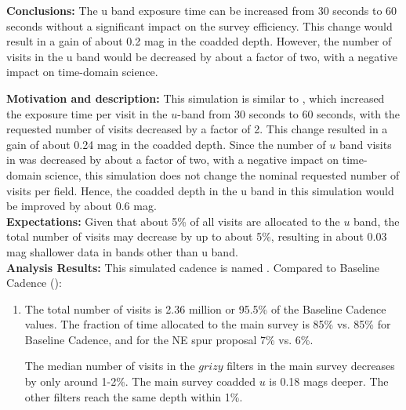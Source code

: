 {\bf Conclusions:} The u band exposure time can be increased from 30
seconds to 60 seconds without a significant impact on the survey
efficiency. This change would result in a gain of about 0.2 mag in the
coadded depth. However, the number of visits in the u band would be
decreased by about a factor of two, with a negative impact on
time-domain science.



{\bf Motivation and description:} This simulation is similar to
, which increased the exposure time
per visit in the $u$-band from 30 seconds to 60 seconds, with the
requested number of visits decreased by a factor of 2. This change
resulted in a gain of about 0.24 mag in the coadded depth. Since the
number of $u$ band visits in  was
decreased by about a factor of two, with a negative impact on
time-domain science, this simulation does not change the nominal
requested number of visits per field. Hence, the coadded depth in the
u band in this simulation would be improved by about 0.6 mag. \\

{\bf Expectations:}  Given that about 5\% of all visits are allocated
to the $u$ band, the total number of visits may decrease by up to
about 5\%, resulting in about 0.03 mag shallower data in bands other
than u band. \\

{\bf Analysis Results:}  This simulated cadence is named
.  Compared to Baseline
Cadence ():
\begin{enumerate}
\item The total number of visits is 2.36 million or 95.5\% of the
Baseline Cadence values. The fraction of time allocated to the main
survey is 85\% vs. 85\% for Baseline Cadence, and for the NE spur
proposal 7\% vs. 6\%.

The median number of visits in the $grizy$ filters in the main survey
decreases by only around 1-2\%.  The main survey coadded $u$ is 0.18
mags deeper. The other filters reach the same depth within 1\%.
\end{enumerate}


